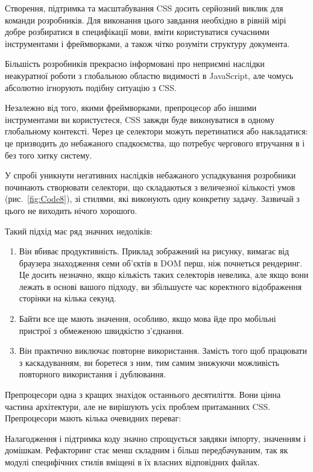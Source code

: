 Створення, підтримка та масштабування CSS досить серйозний виклик для команди розробників. Для виконання цього завдання необхідно в рівній мірі добре розбиратися в специфікації мови, вміти користуватися сучасними інструментами і фреймворками, а також чітко розуміти структуру документа.

Більшість розробників прекрасно інформовані про неприємні наслідки неакуратної роботи з глобальною областю видимості в JavaScript, але чомусь абсолютно ігнорують подібну ситуацію з CSS.

Незалежно від того, якими фреймворками, препроцесор або іншими інструментами ви користуєтеся, CSS завжди буде виконуватися в одному глобальному контексті. Через це селектори можуть перетинатися або накладатися: це призводить до небажаного спадкоємства, що потребує чергового втручання в і без того хитку систему.

У спробі уникнути негативних наслідків небажаного успадкування розробники починають створювати селектори, що складаються з величезної кількості умов (рис.~\ref{fig:Code8}), зі стилями, які виконують одну конкретну задачу. Зазвичай з цього не виходить нічого хорошого.


Такий підхід має ряд значних недоліків:
\begin{enumerate}
    \item Він вбиває продуктивність. Приклад зображений на рисунку, вимагає від браузера знаходження семи об'єктів в DOM перш, ніж почнеться рендеринг. Це досить незначно, якщо кількість таких селекторів невелика, але якщо вони лежать в основі вашого підходу, ви збільшуєте час коректного відображення сторінки на кілька секунд.
    \item Байти все ще мають значення, особливо, якщо мова йде про мобільні пристрої з обмеженою швидкістю з'єднання.
    \item Він практично виключає повторне використання. Замість того щоб працювати з каскадуванням, ви боретеся з ним, тим самим знижуючи можливість повторного використання і дублювання.
\end{enumerate}

Препроцесори одна з кращих знахідок останнього десятиліття. Вони цінна частина архітектури, але не вирішують усіх проблем притаманних CSS. Препроцесори мають кілька очевидних переваг:

Налагодження і підтримка коду значно спрощується завдяки імпорту, значенням і домішкам. Рефакторинг стає менш складним і більш передбачуваним, так як модулі специфічних стилів вміщені в їх власних відповідних файлах.

